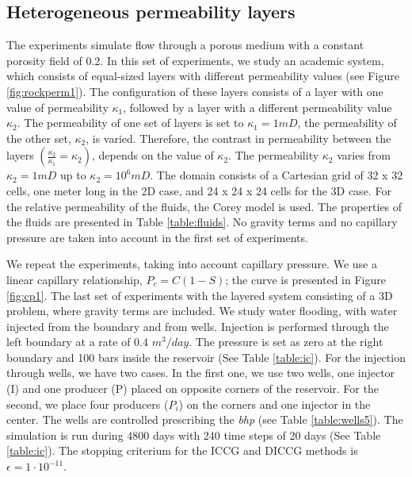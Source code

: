 \documentclass[12pt]{article}
\begin{document}
\subsection{Heterogeneous permeability layers}\label{hetpermlay}

\hspace{0.5cm}The experiments simulate flow through a porous medium with a constant porosity field of 0.2.
In this set of experiments, we study an academic system, which consists of equal-sized layers with different permeability 
values (see Figure \ref{fig:rockperm1}). The configuration of these layers consists of a layer with one value of permeability 
$\kappa_1$, followed by a layer with a different permeability value $\kappa_2$. The permeability of one set of layers is set to 
$\kappa_1=1mD$, the permeability of the other set, $\kappa_2$, is varied. 
Therefore, the contrast in permeability between the layers $(\frac{\kappa_2}{\kappa_1}=\kappa_2)$,
depends on the value of $\kappa_2$.
The permeability $\kappa_2$ varies from $\kappa_2=1mD$ up to $\kappa_2=10^{6}mD$. 
The domain consists of a Cartesian grid of 32 x 32 cells, one meter long in the 2D case, and 24 x 24 x 24 cells for the 3D case. 
For the relative permeability of the fluids, the Corey model is used. The properties of the fluids are presented in Table 
\ref{table:fluids}. No gravity terms and no capillary pressure are taken into account in the first set of experiments.\par
We repeat the experiments, taking into account capillary pressure. We use a linear capillary relationship, $P_c = C(1-S)$; 
the curve is presented in Figure \ref{fig:cp1}. 
The last set of experiments with the layered system consisting of a 3D problem, where gravity terms are included. 
We study water flooding, with water injected from the boundary and from wells. Injection is performed through the left boundary 
at a rate of $0.4$ $m^3/day$. The pressure is set as zero at the right boundary and 100 bars inside the reservoir (See Table 
\ref{table:ic}).
For the injection through wells, we have two cases. In the first one, we use two wells, one injector (I) and one producer (P) 
placed on opposite corners of the reservoir. For the second, we place four producers ($P_i$) on the corners and one injector in 
the center. The wells are controlled prescribing the \emph{bhp} (see Table \ref{table:wells5}).
The simulation is run during 4800 days with 240 time steps of 20 days (See Table \ref{table:ic}). The stopping criterium for 
the ICCG and DICCG methods is $\epsilon =1\cdot10^{-11}$.
\end{document}
